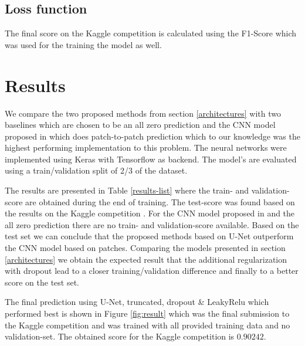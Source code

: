 \documentclass[10pt,conference,compsocconf]{IEEEtran}
\begin{document}
\subsection{Loss function}

The final score on the Kaggle competition \cite{KaggleCompetition} is calculated using the F1-Score which was used for the training the model as well.

\section{Results}

We compare the two proposed methods from section \ref{architectures} with two baselines which are chosen to be an all zero prediction and the CNN model proposed in \cite{Pavllo2017} which does patch-to-patch prediction which to our knowledge was the highest performing implementation to this problem. The neural networks were implemented using Keras with Tensorflow as backend. The model's are evaluated using a train/validation split of 2/3 of the dataset.

The results are presented in Table \ref{results-list} where the train- and validation-score are obtained during the end of training. The test-score was found based on the results on the Kaggle competition \cite{KaggleCompetition}. For the CNN model proposed in \cite{Pavllo2017} and the all zero prediction there are no train- and validation-score available. Based on the test set we can conclude that the proposed methods based on U-Net outperform the CNN model based on patches. Comparing the models presented in section \ref{architectures} we obtain the expected result that the additional regularization with dropout lead to a closer training/validation difference and finally to a better score on the test set.

The final prediction using U-Net, truncated, dropout \& LeakyRelu which performed best is shown in Figure \ref{fig:result} which was the final submission to the Kaggle competition and was trained with all provided training data and no validation-set. The obtained score for the Kaggle competition is $0.90242$.
\end{document}
